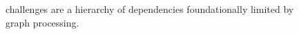 
\begin{figure}[h!]
    \begin{center}
        
        \caption{\gai challenges are a hierarchy of dependencies foundationally limited by graph processing.}
        \label{Figure:gai-challenges}
    \end{center}
\end{figure}


